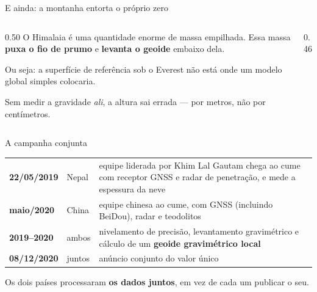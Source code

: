 \documentclass[aspectratio=169,11pt]{beamer}
\newcommand{\bnum}[1]{\textbf{\textcolor{mTeal}{#1}}}
\begin{document}
\begin{frame}{E ainda: a montanha entorta o próprio zero}
  \begin{columns}[T]
    \begin{column}{0.50\textwidth}
      O Himalaia é uma quantidade enorme de massa empilhada. Essa massa \bnum{puxa o fio
      de prumo} e \bnum{levanta o geoide} embaixo dela.
      \medskip

      Ou seja: a superfície de referência sob o Everest \alert{não está onde um modelo
      global simples colocaria}.
      \medskip

      Sem medir a gravidade \emph{ali}, a altura sai errada --- por metros, não por
      centímetros.
    \end{column}
    \begin{column}{0.46\textwidth}
      \centering
    \end{column}
  \end{columns}
\end{frame}

\begin{frame}{A campanha conjunta}
  \centering
  \small
  \renewcommand{\arraystretch}{1.4}
  \begin{tabular}{llp{6.0cm}}
    \toprule
    \textbf{22/05/2019} & Nepal & equipe liderada por Khim Lal Gautam chega ao cume com
      receptor GNSS e radar de penetração, e mede a espessura da neve \\
    \textbf{maio/2020} & China & equipe chinesa ao cume, com GNSS (incluindo BeiDou),
      radar e teodolitos \\
    \textbf{2019--2020} & ambos & nivelamento de precisão, levantamento gravimétrico e
      cálculo de um \bnum{geoide gravimétrico local} \\
    \textbf{08/12/2020} & juntos & anúncio conjunto do valor único \\
    \bottomrule
  \end{tabular}
  \bigskip

  Os dois países processaram \bnum{os dados juntos}, em vez de cada um publicar o seu.
\end{frame}
\end{document}
